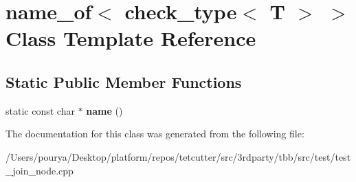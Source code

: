 \hypertarget{classname__of_3_01check__type_3_01T_01_4_01_4}{}\section{name\+\_\+of$<$ check\+\_\+type$<$ T $>$ $>$ Class Template Reference}
\label{classname__of_3_01check__type_3_01T_01_4_01_4}
\subsection*{Static Public Member Functions}
\begin{DoxyCompactItemize}
\item 
\hypertarget{classname__of_3_01check__type_3_01T_01_4_01_4_a5da0b9acb6e738c4a405425e978ada63}{}static const char $\ast$ {\bfseries name} ()\label{classname__of_3_01check__type_3_01T_01_4_01_4_a5da0b9acb6e738c4a405425e978ada63}

\end{DoxyCompactItemize}


The documentation for this class was generated from the following file\+:\begin{DoxyCompactItemize}
\item 
/\+Users/pourya/\+Desktop/platform/repos/tetcutter/src/3rdparty/tbb/src/test/test\+\_\+join\+\_\+node.\+cpp\end{DoxyCompactItemize}
